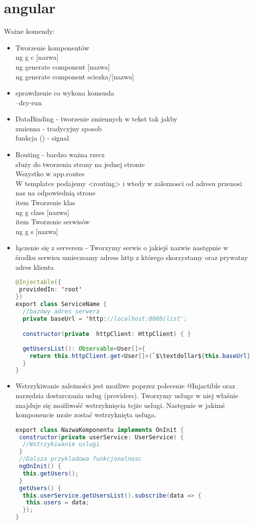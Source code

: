 \section{angular}
Ważne komendy:
\begin{itemize}
	\item Tworzenie komponentów
	\\ng g c [nazwa]
	\\ng generate component [nazwa]
	\\ng generate component sciezka/[nazwa]
	\item sprawdzenie co wykona komenda
	\\ --dry-run
	\item DataBinding - tworzenie zmiennych w tekst tak jakby
	\\ {{ zmienna }} - tradycyjny sposob
	\\ {{ funkcja () }} - signal
	\item Routing - bardzo ważna rzecz
	\\ służy do tworzenia strony na jednej stronie
	\\ Wszystko w app.routes
	\\ W templatce podajemy  <routing> i wtedy w zaleznosci od adresu przenosi nas na odpowiednią strone
	\\item Tworzenie klas 
	\\ng g class [nazwa]
	\\item Tworzenie serwisów
	\\ng g s [nazwa]
	\item łączenie się z serverem - Tworzymy serwis o jakiejś nazwie następnie w środku serwisu umieczsamy adress http z którego skorzystamy oraz prywatny adres klienta
	\begin{lstlisting}[language=Java, caption=Łączenie z serwerem]
@Injectable({
 providedIn: 'root'
})
export class ServiceName {
  //bazowy adres serwera
  private baseUrl = 'http://localhost:8080/list';

  constructor(private  httpClient: HttpClient) { }
	
  getUsersList(): Observable<User[]>{
    return this.httpClient.get<User[]>(`$\textdollar${this.baseUrl}`);
  }
}
	\end{lstlisting}
	\item Wstrzykiwanie zależności jest możliwe poprzez polecenie @Injactible oraz narzędzia dostarczania usług (providers). Tworzymy usługe w niej właśnie znajduje się możliwość wstrzyknięcia tejże usługi. Następnie w jakimś komponencie może zostać wstrzyknięta usługa.
	\begin{lstlisting}[language=Java, caption=Wstrzyknięcie serwisu]
export class NazwaKomponentu implements OnInit {
 constructor(private userService: UserService) {
  //Wstrzykiwanie uslugi
 }
 //Dalsza przykladowa funkcjonalnosc 
 ngOnInit() {
  this.getUsers();
 }
 getUsers() {
  this.userService.getUsersList().subscribe(data => {
   this.users = data;
  });
}
	\end{lstlisting}
	
\end{itemize}